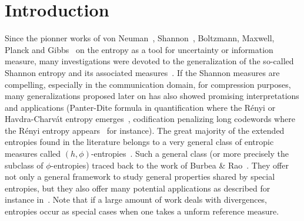 \documentclass[entropy,article,submit,moreauthors,pdftex]{Definitions/mdpi}
\begin{document}

\section{Introduction}
\label{sec:Intro}

Since  the  pionner  works of  von  Neuman~\cite{vNeu27},  Shannon~\cite{Sha48},
Boltzmann, Maxwell, Planck and Gibbs~\cite{Bol64, Bol96, Bol98, Pla15, Nie52:v2,
  Jay65,  MulMul09} on  the entropy  as a  tool for  uncertainty or  information
measure, many investigations were devoted to the generalization of the so-called
Shannon entropy and its associated measures~\cite{Ren61, Var66, HavCha67, Csi67,
  Dar70, AczDar75,  DarJar79, Tsa88,  Sal87, SalMen93, Sal94,  LieVaj06, Bas13}.
If the Shannon measures are  compelling, especially in the communication domain,
for compression purposes, many generalizations proposed later on has also showed
promising   interpretations    and   applications   (Panter-Dite    formula   in
quantification    where     the    R\'enyi    or     Havdra-Charv\'at    entropy
emerges~\cite{PanDit51, Llo82, GerGra92}, codification penalizing long codewords
where the R\'enyi entropy appears~\cite{Cam65,  Ber09} for instance).  The great
majority of  the extended entropies  found in the  literature belongs to  a very
general  class  of  entropic measures  called  $(h,\phi)$-entropies~\cite{Csi67,
  BurRao82, SalMen93,  Sal94, MenMor97, Par06}.   Such a general class  (or more
precisely the subclass of $\phi$-entropies) traced back to the work of Burbea \&
Rao~\cite{BurRao82}. They  offer not only  a general framework to  study general
properties  shared by  special entropies,  but  they also  offer many  potential
applications as  described for instance  in~\cite{Par06}.  Note that if  a large
amount of work deals with divergences, entropies occur as special cases when one
takes a unform reference measure.
\end{document}
